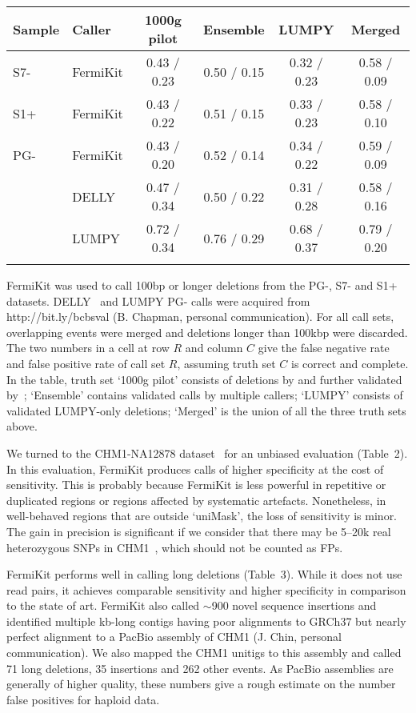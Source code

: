 \documentclass{bioinfo}
\begin{document}
\begin{table}[t]
{\footnotesize
\begin{tabular}{llcccc}
\toprule
Sample& Caller  & {1000g pilot} & {Ensemble} & {LUMPY} & {Merged}\\
\midrule
S7- & FermiKit  & 0.43 / 0.23 & 0.50 / 0.15 & 0.32 / 0.23 & 0.58 / 0.09 \\
S1+ & FermiKit  & 0.43 / 0.22 & 0.51 / 0.15 & 0.33 / 0.23 & 0.58 / 0.10 \\
PG- & FermiKit  & 0.43 / 0.20 & 0.52 / 0.14 & 0.34 / 0.22 & 0.59 / 0.09\\
    & DELLY     & 0.47 / 0.34 & 0.50 / 0.22 & 0.31 / 0.28 & 0.58 / 0.16\\
    & LUMPY     & 0.72 / 0.34 & 0.76 / 0.29 & 0.68 / 0.37 & 0.79 / 0.20\\
\botrule
\end{tabular}}{FermiKit was used to call 100bp or longer deletions from the
PG-, S7- and S1+ datasets. DELLY~\citep{Rausch:2012aa} and LUMPY PG- calls were
acquired from http://bit.ly/bcbsval (B. Chapman, personal communication). For
all call sets, overlapping events were merged and deletions longer than 100kbp
were discarded.  The two numbers in a cell at row $R$ and column $C$ give the
false negative rate and false positive rate of call set $R$, assuming truth set
$C$ is correct and complete.  In the table, truth set `1000g pilot' consists of
deletions by \citet{Mills:2011aa} and further validated
by~\citet{Layer:2014aa}; `Ensemble' contains validated calls by multiple
callers; `LUMPY' consists of validated LUMPY-only deletions; `Merged' is the
union of all the three truth sets above.}
\end{table}

We turned to the CHM1-NA12878 dataset~\citep{Li:2014aa} for an unbiased
evaluation (Table~2). In this evaluation, FermiKit produces calls of higher
specificity at the cost of sensitivity. This is probably because FermiKit is
less powerful in repetitive or duplicated regions or regions affected by
systematic artefacts. Nonetheless, in well-behaved regions that are outside
`uniMask', the loss of sensitivity is minor. The gain in precision is
significant if we consider that there may be 5--20k real heterozygous SNPs in
CHM1~\citep{Li:2014aa}, which should not be counted as FPs.

FermiKit performs well in calling long deletions (Table~3). While
it does not use read pairs, it achieves comparable sensitivity and higher
specificity in comparison to the state of art. FermiKit also called $\sim$900
novel sequence insertions and identified multiple kb-long contigs having 
poor alignments to GRCh37 but nearly perfect alignment to a PacBio assembly of
CHM1 (J. Chin, personal communication). We also mapped the CHM1 unitigs to
this assembly and called 71 long deletions, 35 insertions and 262 other events.
As PacBio assemblies are generally of higher quality, these numbers give a
rough estimate on the number false positives for haploid data.
\end{document}
